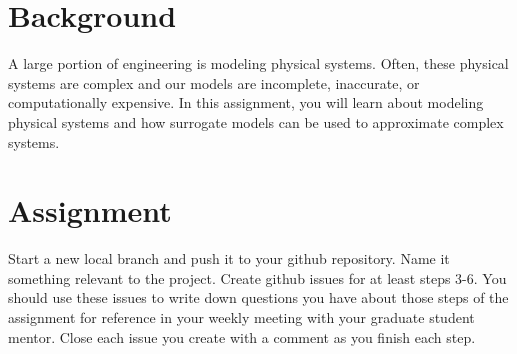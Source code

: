 \documentclass[12pt]{article}
\begin{document}
	


\section{Background}
A large portion of engineering is modeling physical systems. 
Often, these physical systems are complex and our models are incomplete, inaccurate, or computationally expensive.
In this assignment, you will learn about modeling physical systems and how surrogate models can be used to approximate complex systems.



\section{Assignment}

Start a new local branch and push it to your github repository. Name it something relevant to the project. Create github issues for at least steps 3-6. You should use these issues to write down questions you have about those steps of the assignment for reference in your weekly meeting with your graduate student mentor. Close each issue you create with a comment as you finish each step.
\end{document}
